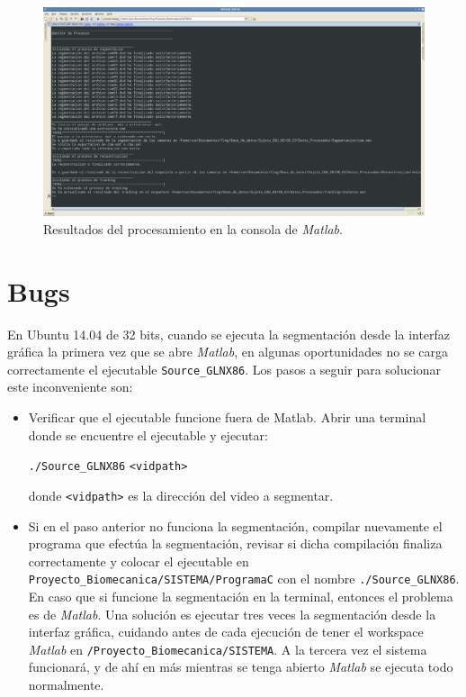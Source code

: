    \begin{figure}[ht!]
    \hspace{-1cm}
    \includegraphics[scale=0.23]{img/Manual_de_usuario/resultados_procesamiento.png}
    \caption{Resultados del procesamiento en la consola de \textit{Matlab}.}
    \label{fig:main.m}
    \end{figure}
   
 
 \section{Bugs}

 
 En Ubuntu 14.04 de 32 bits, cuando se ejecuta la segmentación desde la interfaz gráfica la primera vez que se abre \textit{Matlab}, en algunas oportunidades no se carga correctamente el ejecutable \texttt{Source\_GLNX86}. Los pasos a seguir para solucionar este inconveniente son:
 \begin{itemize}
 \item Verificar que el ejecutable funcione fuera de Matlab. Abrir una terminal donde se encuentre el ejecutable y ejecutar:
 \begin{center}
 \texttt{./Source\_GLNX86} \hspace{0.05cm}   \texttt{<vidpath>}
 \end{center} donde \texttt{<vidpath>} es la dirección del video a segmentar.
 \item Si en el paso anterior no funciona la segmentación, compilar nuevamente el programa que efectúa la segmentación, revisar si dicha compilación finaliza correctamente y colocar el ejecutable en\\ \texttt{Proyecto\_Biomecanica/SISTEMA/ProgramaC} con el nombre \texttt{./Source\_GLNX86}. En caso que si funcione la segmentación en la terminal, entonces el problema es de \textit{Matlab}. Una solución es ejecutar tres veces la segmentación desde la interfaz gráfica, cuidando antes de cada ejecución de tener el workspace \textit{Matlab} en \texttt{/Proyecto\_Biomecanica/SISTEMA}. A la tercera vez el sistema funcionará, y de ahí en más mientras se tenga abierto \textit{Matlab} se ejecuta todo normalmente.
 \end{itemize}
  